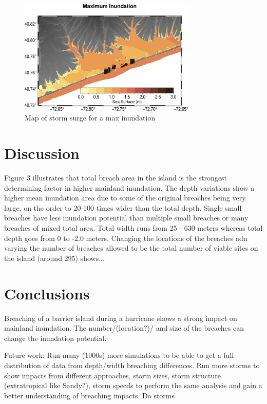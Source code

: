 \documentclass{coastal_paper}
\begin{document}
\begin{figure}
    \centering
    \includegraphics[width=0.75\textwidth]{images/max_inundation.pdf}
    \caption{Map of storm surge for a max inundation}
    \label{fig7}
\end{figure}


\section{Discussion}
Figure 3 illustrates that total breach area in the island is the strongest determining factor in higher mainland inundation. The depth variations show a higher mean inundation area due to some of the original breaches being very large, on the order to 20-100 times wider than the total depth. Single small breaches have less inundation potential than multiple small breaches or many breaches of mixed total area. Total width runs from 25 - 630 meters whereas total depth goes from 0 to -2.0 meters. 
Changing the locations of the breaches adn varying the number of breaches allowed to be the total number of viable sites on the island (around 295) shows...%

\section{Conclusions}
Breaching of a barrier island during a hurricane shows a strong impact on mainland inundation. The number/(location?)/ and size of the breaches can change the inundation potential.

Future work: Run many (1000s) more simulations to be able to get a full distribution of data from depth/width breaching differences. Run more storms to show impacts from different approaches, storm sizes, storm structure (extratropical like Sandy?), storm speeds to perform the same analysis and gain a better understanding of breaching impacts. Do storms


\end{document}
